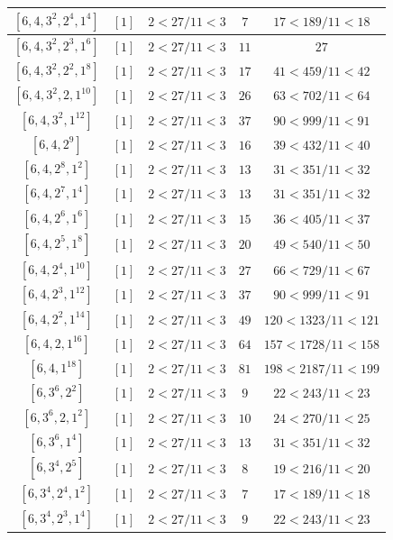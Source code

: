 \documentclass{article}%
\begin{document}
\begin{center}
\begin{longtable}{||c|c|c|c|c||}
$[6, 4, 3^{2}, 2^{4}, 1^{4}]$ & $[1]$ & $2 < 27/11 < 3$ & $7$ & $17 < 189/11 < 18$ \\ \hline 
$[6, 4, 3^{2}, 2^{3}, 1^{6}]$ & $[1]$ & $2 < 27/11 < 3$ & $11$ & $27$ \\ \hline 
$[6, 4, 3^{2}, 2^{2}, 1^{8}]$ & $[1]$ & $2 < 27/11 < 3$ & $17$ & $41 < 459/11 < 42$ \\ \hline 
$[6, 4, 3^{2}, 2, 1^{10}]$ & $[1]$ & $2 < 27/11 < 3$ & $26$ & $63 < 702/11 < 64$ \\ \hline 
$[6, 4, 3^{2}, 1^{12}]$ & $[1]$ & $2 < 27/11 < 3$ & $37$ & $90 < 999/11 < 91$ \\ \hline 
$[6, 4, 2^{9}]$ & $[1]$ & $2 < 27/11 < 3$ & $16$ & $39 < 432/11 < 40$ \\ \hline 
$[6, 4, 2^{8}, 1^{2}]$ & $[1]$ & $2 < 27/11 < 3$ & $13$ & $31 < 351/11 < 32$ \\ \hline 
$[6, 4, 2^{7}, 1^{4}]$ & $[1]$ & $2 < 27/11 < 3$ & $13$ & $31 < 351/11 < 32$ \\ \hline 
$[6, 4, 2^{6}, 1^{6}]$ & $[1]$ & $2 < 27/11 < 3$ & $15$ & $36 < 405/11 < 37$ \\ \hline 
$[6, 4, 2^{5}, 1^{8}]$ & $[1]$ & $2 < 27/11 < 3$ & $20$ & $49 < 540/11 < 50$ \\ \hline 
$[6, 4, 2^{4}, 1^{10}]$ & $[1]$ & $2 < 27/11 < 3$ & $27$ & $66 < 729/11 < 67$ \\ \hline 
$[6, 4, 2^{3}, 1^{12}]$ & $[1]$ & $2 < 27/11 < 3$ & $37$ & $90 < 999/11 < 91$ \\ \hline 
$[6, 4, 2^{2}, 1^{14}]$ & $[1]$ & $2 < 27/11 < 3$ & $49$ & $120 < 1323/11 < 121$ \\ \hline 
$[6, 4, 2, 1^{16}]$ & $[1]$ & $2 < 27/11 < 3$ & $64$ & $157 < 1728/11 < 158$ \\ \hline 
$[6, 4, 1^{18}]$ & $[1]$ & $2 < 27/11 < 3$ & $81$ & $198 < 2187/11 < 199$ \\ \hline 
$[6, 3^{6}, 2^{2}]$ & $[1]$ & $2 < 27/11 < 3$ & $9$ & $22 < 243/11 < 23$ \\ \hline 
$[6, 3^{6}, 2, 1^{2}]$ & $[1]$ & $2 < 27/11 < 3$ & $10$ & $24 < 270/11 < 25$ \\ \hline 
$[6, 3^{6}, 1^{4}]$ & $[1]$ & $2 < 27/11 < 3$ & $13$ & $31 < 351/11 < 32$ \\ \hline 
$[6, 3^{4}, 2^{5}]$ & $[1]$ & $2 < 27/11 < 3$ & $8$ & $19 < 216/11 < 20$ \\ \hline 
$[6, 3^{4}, 2^{4}, 1^{2}]$ & $[1]$ & $2 < 27/11 < 3$ & $7$ & $17 < 189/11 < 18$ \\ \hline 
$[6, 3^{4}, 2^{3}, 1^{4}]$ & $[1]$ & $2 < 27/11 < 3$ & $9$ & $22 < 243/11 < 23$ \\ \hline 

\end{longtable}
\end{center}
\end{document}
